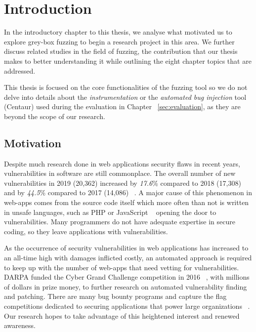 \chapter{Introduction}
\minitoc
\vspace*{1cm}

In the introductory chapter to this thesis, we analyse what motivated us to explore grey-box fuzzing to begin a research project in this area. We further discuss related studies in the field of fuzzing, the contribution that our thesis makes to better understanding it while outlining the eight chapter topics that are addressed.

This thesis is focused on the core functionalities of the fuzzing tool so we do not delve into details about the \emph{instrumentation} or the \emph{automated bug injection} tool (Centaur) used during the evaluation in Chapter ~\ref{sec:evaluation}, as they are beyond the scope of our research.

\section{Motivation}

Despite much research done in web applications security flaws in recent years, vulnerabilities in software are still commonplace. The overall number of new vulnerabilities in 2019 (20,362) increased by \emph{17.6}\% compared to 2018 (17,308) and by \emph{44.5}\% compared to 2017 (14,086) ~\cite{vulnerabilities2019state,owasp2017}. A major cause of this phenomenon in web-apps comes from the source code itself which more often than not is written in unsafe languages, such as PHP or JavaScript ~\cite{vulnerabilities2019state} opening the door to vulnerabilities. Many programmers do not have adequate expertise in secure coding, so they leave applications with vulnerabilities. 

As the occurrence of security vulnerabilities in web applications has increased to an all-time high with damages inflicted costly, an automated approach is required to keep up with the number of web-apps that need vetting for vulnerabilities. DARPA funded the Cyber Grand Challenge competition in 2016 ~\cite{darpa2016cgc}, with millions of dollars in prize money, to further research on automated vulnerability finding and patching. There are many bug bounty programs and capture the flag competitions dedicated to securing applications that power large organizations ~\cite{bugbounty}. Our research hopes to take advantage of this heightened interest and renewed awareness.

